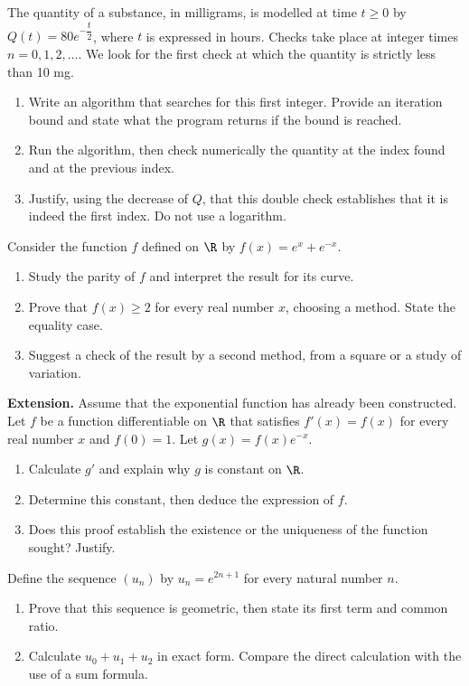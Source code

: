 The quantity of a substance, in milligrams, is modelled at time $t\geq0$ by $Q(t)=80e^{-\dfrac{t}{2}}$, where $t$ is expressed in hours. Checks take place at integer times $n=0,1,2,\ldots$. We look for the first check at which the quantity is strictly less than 10 mg.
\begin{enumerate}[label=\arabic*.]
\item Write an algorithm that searches for this first integer. Provide an iteration bound and state what the program returns if the bound is reached.
\item Run the algorithm, then check numerically the quantity at the index found and at the previous index.
\item Justify, using the decrease of $Q$, that this double check establishes that it is indeed the first index. Do not use a logarithm.
\end{enumerate}
Consider the function $f$ defined on $\R$ by $f(x)=e^x+e^{-x}$.
\begin{enumerate}[label=\arabic*.]
\item Study the parity of $f$ and interpret the result for its curve.
\item Prove that $f(x)\geq2$ for every real number $x$, choosing a method. State the equality case.
\item Suggest a check of the result by a second method, from a square or a study of variation.
\end{enumerate}
\textbf{Extension.} Assume that the exponential function has already been constructed. Let $f$ be a function differentiable on $\R$ that satisfies $f\prime(x)=f(x)$ for every real number $x$ and $f(0)=1$. Let $g(x)=f(x)e^{-x}$.
\begin{enumerate}[label=\arabic*.]
\item Calculate $g\prime$ and explain why $g$ is constant on $\R$.
\item Determine this constant, then deduce the expression of $f$.
\item Does this proof establish the existence or the uniqueness of the function sought? Justify.
\end{enumerate}
Define the sequence $(u_n)$ by $u_n=e^{2n+1}$ for every natural number $n$.
\begin{enumerate}[label=\arabic*.]
\item Prove that this sequence is geometric, then state its first term and common ratio.
\item Calculate $u_0+u_1+u_2$ in exact form. Compare the direct calculation with the use of a sum formula.
\end{enumerate}

